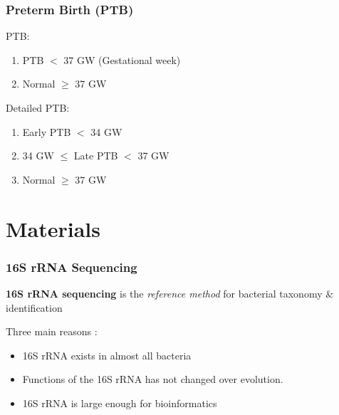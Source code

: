 \documentclass{beamer}
\begin{document}
    \begin{frame}
        \frametitle{Preterm Birth (PTB)}

        PTB:
        \begin{enumerate}
            \item PTB $<$ 37 GW (Gestational week)
            \item Normal $\ge$ 37 GW
        \end{enumerate}

        Detailed PTB:
        \begin{enumerate}
            \item Early PTB $<$ 34 GW
            \item 34 GW $\le$ Late PTB $<$ 37 GW
            \item Normal $\ge$ 37 GW
        \end{enumerate}

        \cite{premature1, premature2}
    \end{frame}

    \section{Materials}
    \begin{frame}
        \frametitle{16S rRNA Sequencing}

        \textbf{16S rRNA sequencing} is the \textit{reference method} for bacterial taxonomy \& identification \cite{16S1}

        Three main reasons \cite{16S2}:
        \begin{itemize}
            \item 16S rRNA exists in almost all bacteria
            \item Functions of the 16S rRNA has not changed over evolution.
            \item 16S rRNA is large enough for bioinformatics
        \end{itemize}
    \end{frame}
\end{document}
